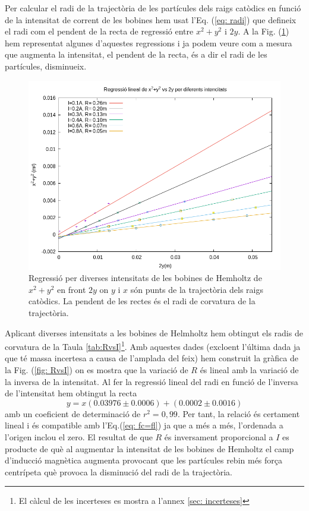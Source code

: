 \documentclass[11pt]{article}
\begin{document}
Per calcular el radi de la trajectòria de les partícules dels raigs catòdics en funció de la intensitat de corrent de les bobines hem usat l'Eq. (\ref{eq: radi}) que defineix el radi com el pendent de la recta de regressió entre $x^2+y^2$ i $2y$. A la Fig. (\ref{fig: regressio_1}) hem representat algunes d'aquestes regressions i ja podem veure com a mesura que augmenta la intensitat, el pendent de la recta, és a dir el radi de les partícules, disminueix. 
\begin{figure}[H]
    \centering
    \includegraphics[scale=0.3]{regressio_1.png}
    \caption{Regressió per diverses intensitats de les bobines de Hemholtz de $x^2+y^2$ en front $2y$ on $y$ i $x$ són punts de la trajectòria dels raigs catòdics. La pendent de les rectes és el radi de corvatura de la trajectòria.}
    \label{fig: regressio_1}
\end{figure}

Aplicant diverses intensitats a les bobines de Helmholtz hem obtingut els radis de corvatura de la Taula \ref{tab:RvsI}\footnote{El càlcul de les incerteses es mostra a l'annex \ref{sec: incerteses}}. Amb aquestes dades (excloent l'última dada ja que té massa incertesa a causa de l'amplada del feix) hem construit la gràfica de la Fig. (\ref{fig: RvsI}) on es mostra que la variació de $R$ és lineal amb la variació de la inversa de la intensitat. 
Al fer la regressió lineal del radi en funció de l'inversa de l'intensitat hem obtingut la recta
\begin{equation}
    y=x(0.03976\pm0.0006)+(0.0002\pm0.0016)
\end{equation}  
amb un coeficient de determinació de $r^2=0,99$. Per tant, la relació és certament lineal i és compatible amb l'Eq.(\ref{eq: fc=fl}) ja que a més a més, l'ordenada a l'origen inclou el zero. El resultat de que $R$ és inversament proporcional a $I$ es producte de què al augmentar la intensitat de les bobines de Hemholtz el camp d'inducció magnètica augmenta provocant que les partícules rebin més força centrípeta què provoca la disminució del radi de la trajectòria.
\end{document}
